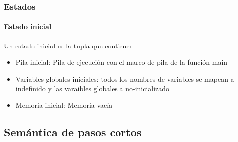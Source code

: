 \begin{frame}
\frametitle{Estados}
\framesubtitle{Estado inicial}

Un estado inicial es la tupla que contiene:

\begin{itemize}
\item{Pila inicial: Pila de ejecución con el marco de pila de la función main}
\item{Variables globales iniciales: todos los nombres de variables se mapean a indefinido y las varaibles globales a no-inicializado}
\item{Memoria inicial: Memoria vacía}
\end{itemize}


\end{frame}


\subsection{Semántica de pasos cortos}


